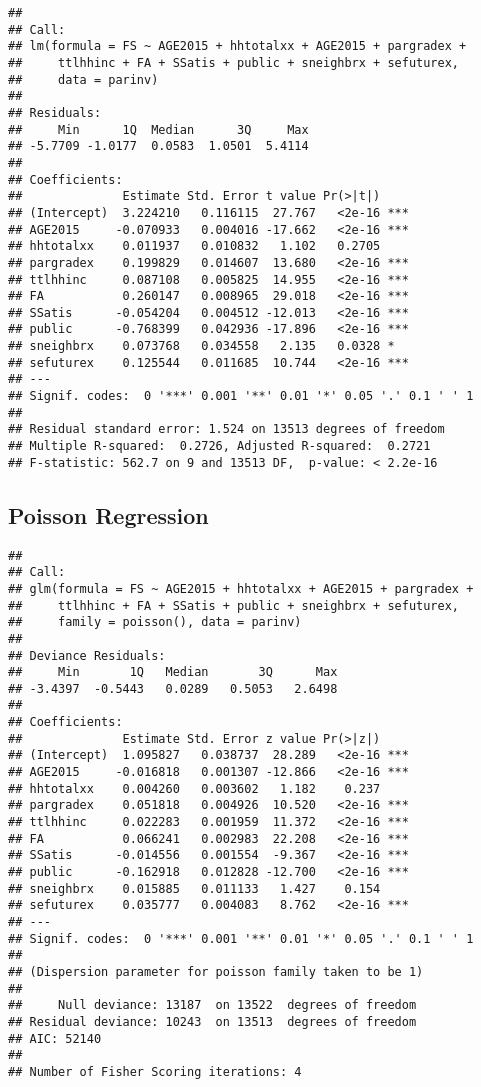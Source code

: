 \documentclass[
  12pt,
]{article}
\begin{document}
\begin{verbatim}
## 
## Call:
## lm(formula = FS ~ AGE2015 + hhtotalxx + AGE2015 + pargradex + 
##     ttlhhinc + FA + SSatis + public + sneighbrx + sefuturex, 
##     data = parinv)
## 
## Residuals:
##     Min      1Q  Median      3Q     Max 
## -5.7709 -1.0177  0.0583  1.0501  5.4114 
## 
## Coefficients:
##              Estimate Std. Error t value Pr(>|t|)    
## (Intercept)  3.224210   0.116115  27.767   <2e-16 ***
## AGE2015     -0.070933   0.004016 -17.662   <2e-16 ***
## hhtotalxx    0.011937   0.010832   1.102   0.2705    
## pargradex    0.199829   0.014607  13.680   <2e-16 ***
## ttlhhinc     0.087108   0.005825  14.955   <2e-16 ***
## FA           0.260147   0.008965  29.018   <2e-16 ***
## SSatis      -0.054204   0.004512 -12.013   <2e-16 ***
## public      -0.768399   0.042936 -17.896   <2e-16 ***
## sneighbrx    0.073768   0.034558   2.135   0.0328 *  
## sefuturex    0.125544   0.011685  10.744   <2e-16 ***
## ---
## Signif. codes:  0 '***' 0.001 '**' 0.01 '*' 0.05 '.' 0.1 ' ' 1
## 
## Residual standard error: 1.524 on 13513 degrees of freedom
## Multiple R-squared:  0.2726, Adjusted R-squared:  0.2721 
## F-statistic: 562.7 on 9 and 13513 DF,  p-value: < 2.2e-16
\end{verbatim}

\hypertarget{poisson-regression}{%
\subsection{\texorpdfstring{\textbf{Poisson
Regression}}{Poisson Regression}}\label{poisson-regression}}

\begin{verbatim}
## 
## Call:
## glm(formula = FS ~ AGE2015 + hhtotalxx + AGE2015 + pargradex + 
##     ttlhhinc + FA + SSatis + public + sneighbrx + sefuturex, 
##     family = poisson(), data = parinv)
## 
## Deviance Residuals: 
##     Min       1Q   Median       3Q      Max  
## -3.4397  -0.5443   0.0289   0.5053   2.6498  
## 
## Coefficients:
##              Estimate Std. Error z value Pr(>|z|)    
## (Intercept)  1.095827   0.038737  28.289   <2e-16 ***
## AGE2015     -0.016818   0.001307 -12.866   <2e-16 ***
## hhtotalxx    0.004260   0.003602   1.182    0.237    
## pargradex    0.051818   0.004926  10.520   <2e-16 ***
## ttlhhinc     0.022283   0.001959  11.372   <2e-16 ***
## FA           0.066241   0.002983  22.208   <2e-16 ***
## SSatis      -0.014556   0.001554  -9.367   <2e-16 ***
## public      -0.162918   0.012828 -12.700   <2e-16 ***
## sneighbrx    0.015885   0.011133   1.427    0.154    
## sefuturex    0.035777   0.004083   8.762   <2e-16 ***
## ---
## Signif. codes:  0 '***' 0.001 '**' 0.01 '*' 0.05 '.' 0.1 ' ' 1
## 
## (Dispersion parameter for poisson family taken to be 1)
## 
##     Null deviance: 13187  on 13522  degrees of freedom
## Residual deviance: 10243  on 13513  degrees of freedom
## AIC: 52140
## 
## Number of Fisher Scoring iterations: 4
\end{verbatim}
\end{document}
